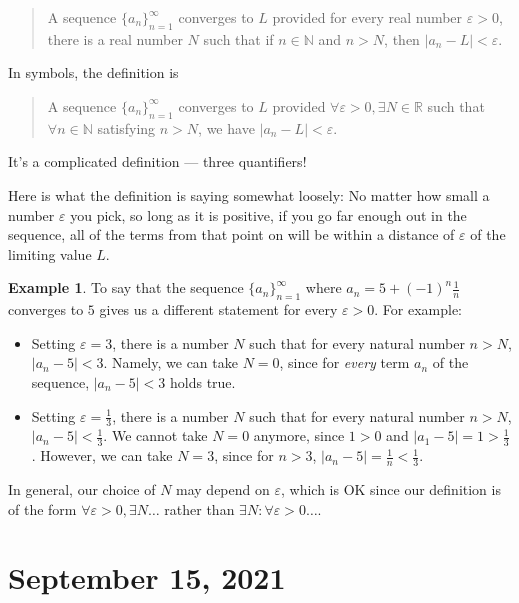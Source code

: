 \documentclass[12pt]{amsart}
\def\e{\varepsilon}
\newcommand{\R}{{\mathbb{R}}}
\newcommand{\N}{\mathbb{N}}
\numberwithin{equation}{section}
\theoremstyle{plain} %
\newcommand{\Sept}[1]{\section{September #1, 2021}}
\theoremstyle{definition}
\newtheorem{ex}[equation]{Example}
\theoremstyle{remark}
\begin{document}
\begin{quote}
A sequence $\{a_n\}_{n=1}^\infty$ converges to $L$ provided
for every real number $\e > 0$, there is a real number $N$ such that if $n \in \N$ and $n > N$, then $|a_n - L| < \e$.
\end{quote}




In symbols, the definition is 
\begin{quote}
A sequence $\{a_n\}_{n=1}^\infty$ converges to $L$ provided
$\forall \e >0, {\exists N \in \R}$ such that ${\forall n \in \N}$ satisfying 
$n > N$, we have ${|a_n - L| < \e}$. 
\end{quote}

It's a complicated definition --- three quantifiers!


Here is what the definition is saying somewhat loosely: No matter how small a number $\e$ you pick, so long as it is positive, if you go far enough out in the sequence, all of
the terms from that point on will be within a distance of $\e$ of the limiting value $L$.

\begin{ex} To say that the sequence $\{a_n\}_{n=1}^\infty$ where $a_n =  5 + (-1)^n \frac{1}{n}$ converges to $5$ gives us a different statement for every $\e>0$. For example:
\begin{itemize}
\item Setting $\e=3$, there is a number $N$ such that for every natural number $n>N$, $|a_n-5|<3$. Namely, we can take $N=0$, since for \emph{every} term $a_n$ of the sequence, $|a_n-5|<3$ holds true.
\item Setting $\e=\frac13$, there is a number $N$ such that for every natural number $n>N$, $|a_n-5|<\frac13$. We cannot take $N=0$ anymore, since $1>0$ and $|a_1-5|=1>\frac13$. However, we can take $N=3$, since for $n>3$, $|a_n-5|=\frac1n <\frac13$.
\end{itemize}

In general, our choice of $N$ may depend on $\e$, which is OK since our definition is of the form $\forall \e>0,\exists N\dots$ rather than $\exists N:\forall \e>0\dots$.
\end{ex}


\Sept{15}
\end{document}
